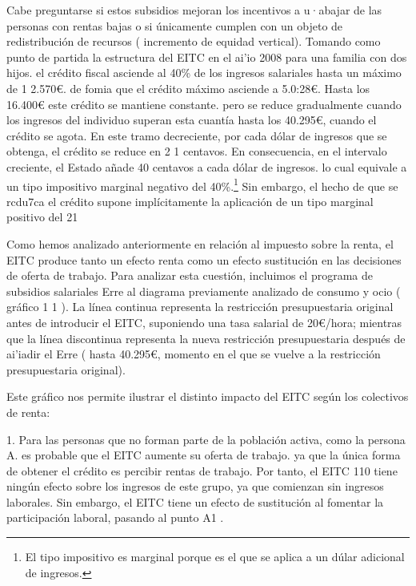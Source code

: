 \documentclass[10pt,a4paper]{article}
\begin{document}
Cabe preguntarse si estos subsidios mejoran los incentivos a u·abajar de las personas con rentas bajas o si únicamente cumplen con un objeto de redistribución de recursos ( incremento de equidad vertical). Tomando como punto de partida la estructura del EITC en el ai'io 2008 para una familia con dos hijos. el crédito fiscal asciende al 40\% de los ingresos salariales hasta un máximo de 1 2.570€. de fomia que el crédito máximo asciende a 5.0:28€. Hasta los 16.400€ este crédito se mantiene constante. pero se reduce gradualmente cuando los ingresos del individuo superan esta cuantía hasta los 40.295€, cuando el crédito se agota. En este tramo decreciente, por cada dólar de ingresos que se obtenga, el crédito se reduce en 2 1 centavos. En consecuencia, en el intervalo creciente, el Estado añade 40 centavos a cada dólar de ingresos. lo cual equivale a un tipo impositivo marginal negativo del 40\%.\footnote{%
    El tipo impositivo es marginal porque es el que se aplica a un dúlar adicional de ingresos.
} Sin embargo, el hecho de que se rcdu7ca el crédito supone implícitamente la aplicación de un tipo marginal positivo del 21 %

Como hemos analizado anteriormente en relación al impuesto sobre la renta, el EITC produce tanto un efecto renta como un efecto sustitución en las decisiones de oferta de trabajo. Para analizar esta cuestión, incluimos el programa de subsidios salariales Erre al diagrama previamente analizado de consumo y ocio ( gráfico 1 1 ). La línea continua representa la restricción presupuestaria original antes de introducir el EITC, suponiendo una tasa salarial de 20€/hora; mientras que la línea discontinua representa la nueva restricción presupuestaria después de ai'iadir el Erre ( hasta 40.295€, momento en el que se vuelve a la restricción presupuestaria original).

Este gráfico nos permite ilustrar el distinto impacto del EITC según los colectivos de renta:

1. Para las personas que no forman parte de la población activa, como la persona A. es probable que el EITC aumente su oferta de trabajo. ya que la única forma de obtener el crédito es percibir rentas de trabajo. Por tanto, el EITC 110 tiene ningún efecto sobre los ingresos de este grupo, ya que comienzan sin ingresos laborales. Sin embargo, el EITC tiene un efecto de sustitución al fomentar la participación laboral, pasando al punto A1 .
\end{document}
